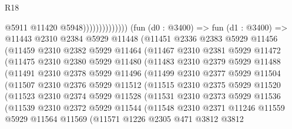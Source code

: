 \begin{lexlean}{R18}
\begin{coremodule}
                                    @5911
                                    @11420
                                    @5948))))))))))))))
        (fun (d0 : @3400) =>
        fun (d1 : @3400) =>
        @11443
          @2310
          @2384
          @5929
          @11448
          (@11451
            @2336
            @2383
            @5929
            @11456
            (@11459
              @2310
              @2382
              @5929
              @11464
              (@11467
                @2310
                @2381
                @5929
                @11472
                (@11475
                  @2310
                  @2380
                  @5929
                  @11480
                  (@11483
                    @2310
                    @2379
                    @5929
                    @11488
                    (@11491
                      @2310
                      @2378
                      @5929
                      @11496
                      (@11499
                        @2310
                        @2377
                        @5929
                        @11504
                        (@11507
                          @2310
                          @2376
                          @5929
                          @11512
                          (@11515
                            @2310
                            @2375
                            @5929
                            @11520
                            (@11523
                              @2310
                              @2374
                              @5929
                              @11528
                              (@11531
                                @2310
                                @2373
                                @5929
                                @11536
                                (@11539
                                  @2310
                                  @2372
                                  @5929
                                  @11544
                                  (@11548
                                    @2310
                                    @2371
                                    @11246
                                    @11559
                                    @5929
                                    @11564
                                    @11569
                                    (@11571
                                      @1226
                                      @2305
                                      @471
                                      @3812
                                      @3812

\end{coremodule}
\end{lexlean}
